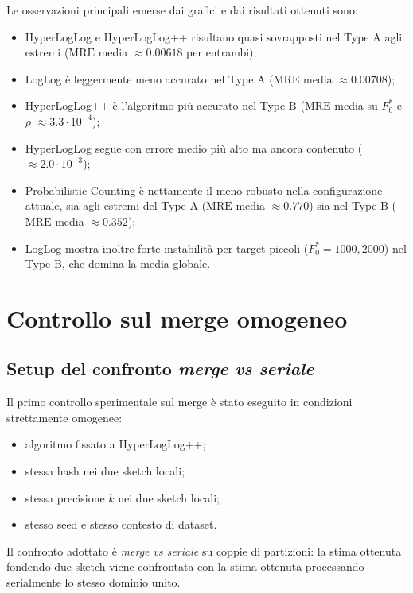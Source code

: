 Le osservazioni principali emerse dai grafici e dai risultati ottenuti sono:
\begin{itemize}
    \item HyperLogLog e HyperLogLog++ risultano quasi sovrapposti nel Type A
    agli estremi (\(\mathrm{MRE}\) media \(\approx 0.00618\) per entrambi);
    \item LogLog è leggermente meno accurato nel Type A
    (\(\mathrm{MRE}\) media \(\approx 0.00708\));
    \item HyperLogLog++ è l'algoritmo più accurato nel Type B
    (\(\mathrm{MRE}\) media su \(F_0^{\ast}\) e \(\rho\)
    \(\approx 3.3\cdot 10^{-4}\));
    \item HyperLogLog segue con errore medio più alto ma ancora contenuto
    (\(\approx 2.0\cdot 10^{-3}\));
    \item Probabilistic Counting è nettamente il meno robusto nella configurazione
    attuale, sia agli estremi del Type A
    (\(\mathrm{MRE}\) media \(\approx 0.770\)) sia nel Type B
    (\(\mathrm{MRE}\) media \(\approx 0.352\));
    \item LogLog mostra inoltre forte instabilità per target piccoli
    (\(F_0^{\ast}=1000,2000\)) nel Type B, che domina la media globale.
\end{itemize}

\section{Controllo sul merge omogeneo}

\subsection{Setup del confronto \emph{merge vs seriale}}

Il primo controllo sperimentale
sul merge è stato eseguito in condizioni strettamente omogenee:
\begin{itemize}
    \item algoritmo fissato a HyperLogLog++;
    \item stessa hash nei due sketch locali;
    \item stessa precisione \(k\) nei due sketch locali;
    \item stesso seed e stesso contesto di dataset.
\end{itemize}

Il confronto adottato è \emph{merge vs seriale} su coppie di partizioni: la
stima ottenuta fondendo due sketch viene confrontata con la stima ottenuta
processando serialmente lo stesso dominio unito.


